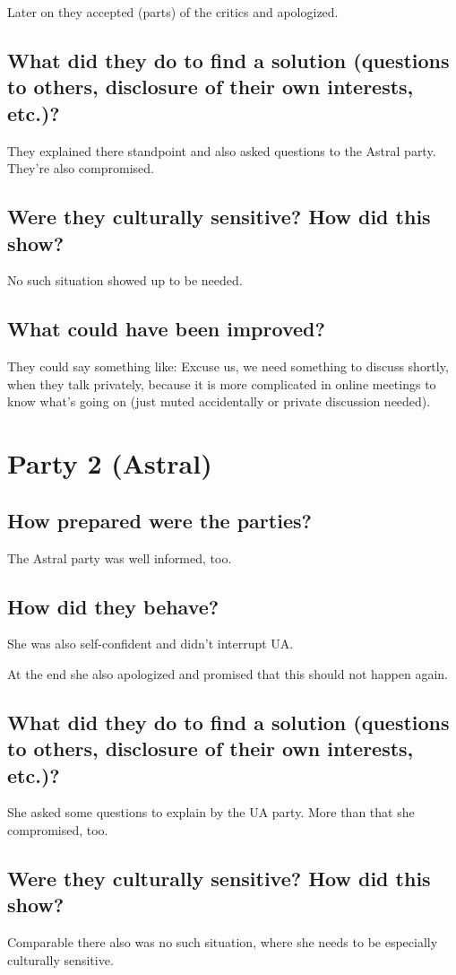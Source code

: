 \documentclass[11pt,fleqn]{book} %
\begin{document}
Later on they accepted (parts) of the critics and apologized.

\subsection{What did they do to find a solution (questions to others, disclosure of their own interests, etc.)?}
They explained there standpoint and also asked questions to the Astral party. They're also compromised.

\subsection{Were they culturally sensitive? How did this show?}
No such situation showed up to be needed.

\subsection{What could have been improved?}
They could say something like: Excuse us, we need something to discuss shortly, when they talk privately, because it is more complicated in online meetings to know what's going on (just muted accidentally or private discussion needed).

\section{Party 2 (Astral)}
\subsection{How prepared were the parties?}
The Astral party was well informed, too.

\subsection{How did they behave?}
She was also self-confident and didn't interrupt UA.

At the end she also apologized and promised that this should not happen again.

\subsection{What did they do to find a solution (questions to others, disclosure of their own interests, etc.)?}
She asked some questions to explain by the UA party. More than that she compromised, too.

\subsection{Were they culturally sensitive? How did this show?}
Comparable there also was no such situation, where she needs to be especially culturally sensitive.
\end{document}
